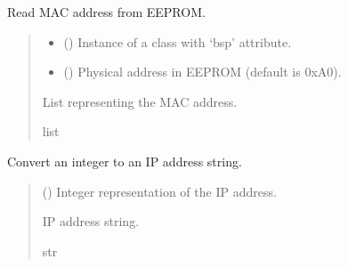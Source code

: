 \documentclass[letterpaper,10pt,english]{sphinxmanual}
\begin{document}
\begin{fulllineitems}
\label{\detokenize{cplddocs:config_ip.get_mac_from_eep}}
\pysigstartsignatures
{}
\pysigstopsignatures
\sphinxAtStartPar
Read MAC address from EEPROM.
\begin{quote}\begin{description}
\begin{itemize}
\item {} 
\sphinxAtStartPar
{} () \textendash{} Instance of a class with ‘bsp’ attribute.

\item {} 
\sphinxAtStartPar
{} () \textendash{} Physical address in EEPROM (default is 0xA0).

\end{itemize}

\sphinxAtStartPar
List representing the MAC address.

\sphinxAtStartPar
list

\end{description}\end{quote}

\end{fulllineitems}


\begin{fulllineitems}
\label{\detokenize{cplddocs:config_ip.int2ip}}
\pysigstartsignatures
{}
\pysigstopsignatures
\sphinxAtStartPar
Convert an integer to an IP address string.
\begin{quote}\begin{description}
\sphinxAtStartPar
{} () \textendash{} Integer representation of the IP address.

\sphinxAtStartPar
IP address string.

\sphinxAtStartPar
str

\end{description}\end{quote}

\end{fulllineitems}
\end{document}
